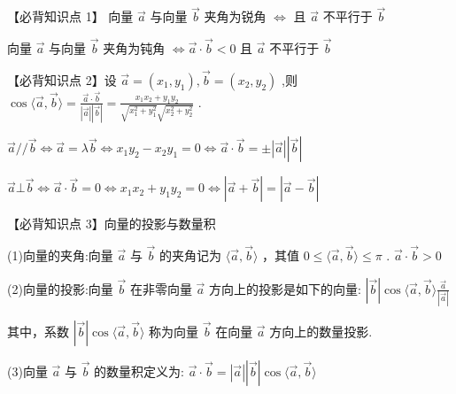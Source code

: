 \documentclass[10pt]{article}
\newcommand*\circled[1]{\tikz[baseline=(char.base)]{\node[shape=circle,draw,inner sep=1.5pt] (char) {\small #1};}}
\begin{document}
【必背知识点 1】 \circled{1} 向量 \(\overrightarrow{a}\) 与向量 \(\overrightarrow{b}\) 夹角为锐角 \(\Leftrightarrow\) 且 \(\overrightarrow{a}\) 不平行于 \(\overrightarrow{b}\)

 \circled{2} 向量 \(\overrightarrow{a}\) 与向量 \(\overrightarrow{b}\) 夹角为钝角 \(\Leftrightarrow  \overrightarrow{a} \cdot  \overrightarrow{b} < 0\) 且 \(\overrightarrow{a}\) 不平行于 \(\overrightarrow{b}\)

【必背知识点 2】设 \(\overrightarrow{a} = \left( {{x}_{1},{y}_{1}}\right) ,\overrightarrow{b} = \left( {{x}_{2},{y}_{2}}\right)\) ,则 \(\cos \langle \overrightarrow{a},\overrightarrow{b}\rangle  = \frac{\overrightarrow{a} \cdot  \overrightarrow{b}}{\left| \overrightarrow{a}\right| \left| \overrightarrow{b}\right| } = \frac{{x}_{1}{x}_{2} + {y}_{1}{y}_{2}}{\sqrt{{x}_{1}^{2} + {y}_{1}^{2}}\sqrt{{x}_{2}^{2} + {y}_{2}^{2}}}\) .

\(\overrightarrow{a}//\overrightarrow{b} \Leftrightarrow  \overrightarrow{a} = \lambda \overrightarrow{b} \Leftrightarrow  {x}_{1}{y}_{2} - {x}_{2}{y}_{1} = 0 \Leftrightarrow  \overrightarrow{a} \cdot  \overrightarrow{b} =  \pm  \left| \overrightarrow{a}\right| \left| \overrightarrow{b}\right|\)

\(\overrightarrow{a} \bot  \overrightarrow{b} \Leftrightarrow  \overrightarrow{a} \cdot  \overrightarrow{b} = 0 \Leftrightarrow  {x}_{1}{x}_{2} + {y}_{1}{y}_{2} = 0 \Leftrightarrow  \left| {\overrightarrow{a} + \overrightarrow{b}}\right|  = \left| {\overrightarrow{a} - \overrightarrow{b}}\right|\)

【必背知识点 3】向量的投影与数量积

(1)向量的夹角:向量 \(\overrightarrow{a}\) 与 \(\overrightarrow{b}\) 的夹角记为 \(\langle \overrightarrow{a},\overrightarrow{b}\rangle\) ，其值 \(0 \leq  \langle \overrightarrow{a},\overrightarrow{b}\rangle  \leq  \pi\) . \(\overrightarrow{a} \cdot  \overrightarrow{b} > 0\)

(2)向量的投影:向量 \(\overrightarrow{b}\) 在非零向量 \(\overrightarrow{a}\) 方向上的投影是如下的向量: \(\left| \overrightarrow{b}\right| \cos \langle \overrightarrow{a},\overrightarrow{b}\rangle \frac{\overrightarrow{a}}{\left| \overrightarrow{a}\right| }\)

其中，系数 \(\left| \overrightarrow{b}\right| \cos \langle \overrightarrow{a},\overrightarrow{b}\rangle\) 称为向量 \(\overrightarrow{b}\) 在向量 \(\overrightarrow{a}\) 方向上的数量投影.

(3)向量 \(\overrightarrow{a}\) 与 \(\overrightarrow{b}\) 的数量积定义为: \(\overrightarrow{a} \cdot  \overrightarrow{b} = \left| \overrightarrow{a}\right| \left| \overrightarrow{b}\right| \cos \langle \overrightarrow{a},\overrightarrow{b}\rangle\)
\end{document}
